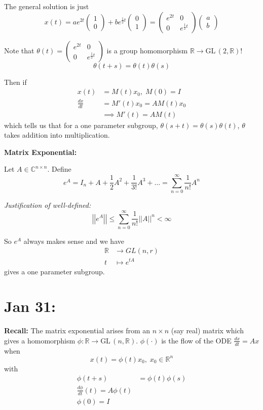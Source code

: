 \documentclass[12pt]{article}
\newcommand{\R}{\mathbb{R}}
\newcommand{\C}{\mathbb{C}}
\newcommand{\norm}[1]{\left\vert \left\vert #1 \right\vert \right\vert}
\newcommand{\GL}{\text{GL}\,}
\begin{document}
    The general solution is just 
    \[x(t) = ae^{2t} \begin{pmatrix}
        1\\0
    \end{pmatrix} + be^{\frac{1}{2}t} \begin{pmatrix}
        0\\1
    \end{pmatrix} = \begin{pmatrix}
        e^{2t} & 0\\ 
        0 & e^{\frac{1}{2}t}
    \end{pmatrix} \begin{pmatrix}
        a\\b
    \end{pmatrix}\]

    Note that $\theta(t) = \begin{pmatrix}
        e^{2t} & 0\\ 
        0 & e^{\frac{1}{2}t}
    \end{pmatrix}$ is a group homomorphism $\R \to \GL(2, \R)$! 
    \[\theta(t + s) = \theta(t) \theta(s)\]

    Then if 
    \begin{align*}
        x(t) &= M(t) x_0, \; M(0) = I\\ 
        \frac{dx}{dt} &= M'(t)x_0 = AM(t)x_0\\ 
        &\implies M'(t) = AM(t)
    \end{align*}
    which tells us that for a one parameter subgroup, $\theta(s + t) = \theta(s) \theta(t)$, $\theta$ takes addition into multiplication. 

    \textbf{Matrix Exponential:} 

    Let $A \in \C^{n\times n}$. Define 
    \[e^A = I_n + A + \frac{1}{2} A^2 + \frac{1}{3!} A^3 + \dots = \sum_{n=0}^{\infty} \frac{1}{n!}A^n\]

    \emph{Justification of well-defined:}
    \[\norm{e^A} \leq \sum_{n=0}^{\infty} \frac{1}{n!} \norm{A}^n < \infty\] 

    So $e^A$ always makes sense and we have 
    \begin{align*}
        \R &\to GL(n, r)\\
        t &\mapsto e^{tA}
    \end{align*} 
    gives a one parameter subgroup.

\section{Jan 31:}
    \textbf{Recall:} The matrix exponential arises from an $n \times n$ (say real) matrix which gives a homomorphism $\phi: \R \to \GL(n, \R)$. $\phi(\cdot)$ is the flow of the ODE $\frac{dx}{dt} = Ax$ when 
    \[x(t) = \phi(t) x_0, \; x_0 \in \R^n\]
    with
    \begin{align*}
        \phi(t + s) &= \phi(t) \phi(s)\\ 
        \frac{d\phi}{dt}(t) = A\phi(t)\\ 
        \phi(0) = I
    \end{align*}
    
\end{document}
